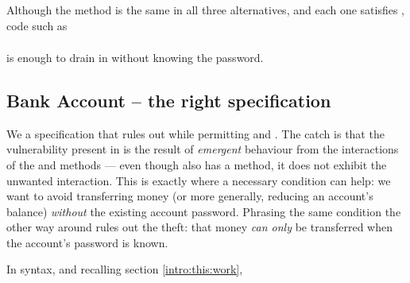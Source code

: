 Although the  method is the same in
all three alternatives, and each one satisfies \Sclassic,
code  {such as}
\\ 
$\ \strut \hspace{.2in} $ 
\\ 
is enough to drain   in \ModB without knowing the password.


 \subsection{Bank Account -- the right specification}
\label{s:bankSpecEx}

We  a specification that rules out \ModB while permitting \ModA and
\ModC. The catch is that the vulnerability present in \ModB is the result
of  \emph{emergent} behaviour from the interactions of the 
and  methods --- even though \ModC also has a
 method, it does not exhibit the unwanted interaction.
This is exactly where a necessary condition can help:
we want to avoid transferring money
(or more generally, reducing an account's balance)
\textit{without} the existing account password.  Phrasing the same condition
the other way around %
rules out the theft: that money \textit{can only} be
transferred when the account's password is known.


In \Nec  syntax, and {recalling section \ref{intro:this:work}, }
 

